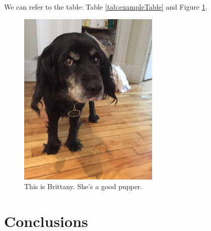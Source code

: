 \documentclass[12pt]{article}
\begin{document}
We can refer to the table: Table \ref{tab:exampleTable} and Figure \ref{fig:brittany}.

\begin{figure}[p]
\centering
\includegraphics[width=0.6\textwidth]{figures/brittany}
\caption{This is Brittany. She's a good pupper.}
\label{fig:brittany}
\end{figure}

\section{Conclusions}


\subsection{}

\lipsum[1]

\subsubsection{}

\lipsum[5]

\subsubsection{}

\lipsum[1]

\subsection{}
\subsubsection{}
\lipsum[3]
\subsubsection{}
\lipsum[1]

%
%



\end{document}
